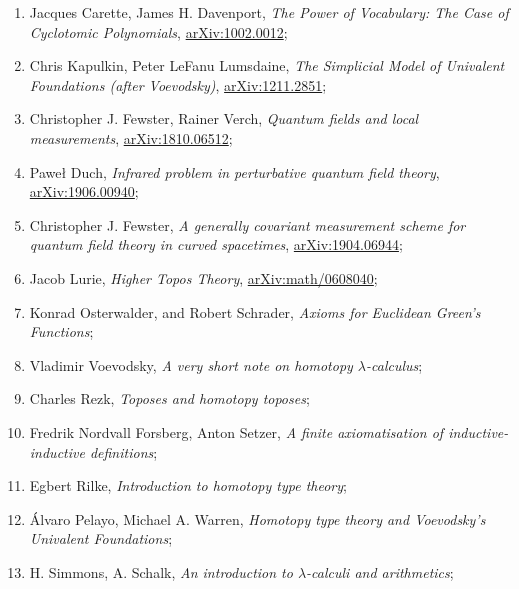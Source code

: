 \documentclass[a4paper,11pt]{article}
\begin{document}
\begin{enumerate}
\item Jacques Carette, James H. Davenport, \emph{The Power of
    Vocabulary: The Case of Cyclotomic Polynomials},
  \href{https://arxiv.org/abs/1002.0012v1}{arXiv:1002.0012};

\item Chris Kapulkin, Peter LeFanu Lumsdaine, \emph{The Simplicial
    Model of Univalent Foundations (after Voevodsky)},
  \href{https://arxiv.org/abs/1211.2851v5}{arXiv:1211.2851};

\item Christopher J. Fewster, Rainer Verch, \emph{Quantum fields and
    local measurements},
  \href{https://arxiv.org/abs/1810.06512}{arXiv:1810.06512};

\item Paweł Duch, \emph{Infrared problem in perturbative quantum field
    theory},
  \href{https://arxiv.org/abs/1906.00940}{arXiv:1906.00940};

\item Christopher J. Fewster, \emph{A generally covariant measurement
    scheme for quantum field theory in curved spacetimes},
  \href{https://arxiv.org/abs/1904.06944v1}{arXiv:1904.06944};

\item Jacob Lurie, \emph{Higher Topos Theory},
  \href{https://arxiv.org/abs/math/0608040v4}{arXiv:math/0608040};

\item Konrad Osterwalder, and Robert Schrader, \emph{Axioms for
    Euclidean Green's Functions};

\item Vladimir Voevodsky, \emph{A very short note on homotopy
    $\lambda$-calculus};

\item Charles Rezk, \emph{Toposes and homotopy toposes};

\item Fredrik Nordvall Forsberg, Anton Setzer, \emph{A finite
    axiomatisation of inductive-inductive definitions};

\item Egbert Rilke, \emph{Introduction to homotopy type theory};

\item \'{A}lvaro Pelayo, Michael A. Warren, \emph{Homotopy type theory
    and Voevodsky’s Univalent Foundations};

\item H. Simmons, A. Schalk, \emph{An introduction to
    $\lambda$-calculi and arithmetics};


\end{enumerate}
\end{document}
